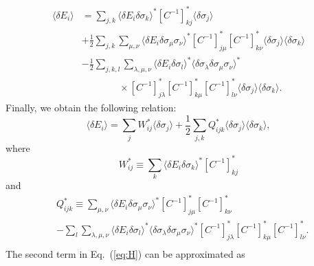 \documentclass[prx,twocolumn,twoside,showpacs,superscriptaddress]{revtex4-1}
\begin{document}
\begin{align}
\langle \delta E_i \rangle &= \sum_{j,k} \langle \delta E_i \delta \sigma_k \rangle^* [C^{-1}]^*_{kj} \langle \delta \sigma_j \rangle \nonumber \\
&+ \frac{1}{2}  \sum_{j,k} \sum_{\mu, \nu} \langle \delta E_i \delta \sigma_{\mu} \sigma_{\nu} \rangle^*[C^{-1}]^*_{j\mu}[C^{-1}]^*_{k\nu} \langle \delta \sigma_j \rangle \langle \delta \sigma_k \rangle \nonumber \\
& - \frac{1}{2}  \sum_{j,k,l} \sum_{\lambda, \mu, \nu} \langle \delta E_i \delta \sigma_l \rangle^* \langle \delta \sigma_\lambda \delta \sigma_\mu \sigma_\nu \rangle^* \nonumber \\
& \phantom{MMMM} \times [C^{-1}]^*_{j\lambda} [C^{-1}]^*_{k\mu} [C^{-1}]^*_{l\nu} \langle \delta \sigma_j \rangle \langle \delta \sigma_k \rangle. 
\end{align}
Finally, we obtain the following relation:
\begin{equation}
\label{eq:H}
\langle \delta E_i \rangle = \sum_j W_{ij}^* \langle \delta \sigma_j \rangle + \frac{1}{2} \sum_{j,k} Q_{ijk}^* \langle \delta \sigma_j \rangle \langle \delta \sigma_k \rangle,
\end{equation}
where 
\begin{equation}
W_{ij}^* \equiv \sum_{k} \langle \delta E_i \delta \sigma_k \rangle^* [C^{-1}]^*_{kj}
\end{equation}
and
\begin{align}
&Q_{ijk}^* \equiv \sum_{\mu, \nu} \langle \delta E_i \delta \sigma_{\mu} \sigma_{\nu} \rangle^*[C^{-1}]^*_{j\mu}[C^{-1}]^*_{k\nu} \nonumber \\
&- \sum_{l} \sum_{\lambda, \mu, \nu} \langle \delta E_i \delta \sigma_l \rangle^* \langle \delta \sigma_\lambda \delta \sigma_\mu \sigma_\nu \rangle^* [C^{-1}]^*_{j\lambda} [C^{-1}]^*_{k\mu} [C^{-1}]^*_{l\nu}. \nonumber \\
\end{align}
The second term in Eq.~(\ref{eq:H}) can be approximated as
\end{document}
